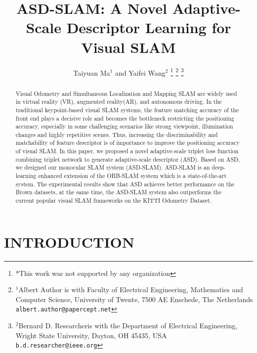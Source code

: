 \documentclass[letterpaper, 10 pt, conference]{ieeeconf}  %
\title{\LARGE \bf
ASD-SLAM:  A Novel Adaptive-Scale Descriptor Learning for Visual SLAM 
}
\author{Taiyuan Ma$^{1}$ and Yaifei Wang$^{2}$%
\thanks{*This work was not supported by any organization}%
\thanks{$^{1}$Albert Author is with Faculty of Electrical Engineering, Mathematics and Computer Science,
        University of Twente, 7500 AE Enschede, The Netherlands
        {\tt\small albert.author@papercept.net}}%
\thanks{$^{2}$Bernard D. Researcheris with the Department of Electrical Engineering, Wright State University,
        Dayton, OH 45435, USA
        {\tt\small b.d.researcher@ieee.org}}%
}
\begin{document}
\maketitle
\thispagestyle{empty}
\pagestyle{empty}


\begin{abstract}

Visual Odometry and Simultaneous Localization and Mapping SLAM are widely used in virtual reality (VR), augmented reality(AR), and autonomous driving. In the traditional keypoint-based visual SLAM systems, the feature matching accuracy of the front end plays a decisive role and becomes the bottleneck restricting the positioning accuracy, especially in some challenging scenarios like strong viewpoint, illumination changes and highly repetitive scenes. Thus, increasing the discriminability and matchability of feature descriptor is of importance to improve the positioning accuracy of visual SLAM.  In this paper, we proposed a novel adaptive-scale triplet loss function combining triplet network to generate adaptive-scale descriptor (ASD). Based on ASD, we designed our monocular SLAM system (ASD-SLAM). ASD-SLAM is an deep-learning enhanced extension of the ORB-SLAM system which is a state-of-the-art system. The experimental results show that ASD achieves better performance on the Brown datasets, at the same time, the ASD-SLAM system also outperforms the current popular visual SLAM frameworks on the KITTI Odometry Dataset. 
\end{abstract}


\section{INTRODUCTION}
\end{document}
